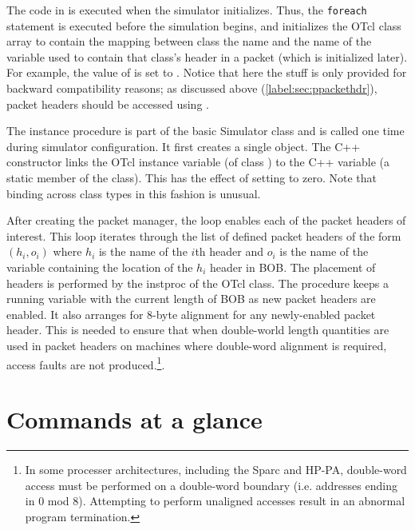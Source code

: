 The code in  is executed
when the simulator initializes.
Thus, the {\tt foreach} statement is executed before the
simulation begins, and initializes the OTcl class array
 to contain the mapping between class
the name and the name of the variable used to contain
that class's header in a packet (which is initialized later).
For example, the value of  is set to
.
Notice that here the  stuff is only provided
for backward compatibility reasons;
as discussed above (\ref{label:sec:ppackethdr}), packet headers should
be accessed using . 

The  instance procedure is part of the
basic Simulator class and is called one time during simulator
configuration.
It first creates a single  object.
The C++ constructor links the OTcl instance
variable  (of class )
to the C++ variable  (a static
member of the  class).
This has the effect of setting  to
zero.
Note that binding across class types in this fashion is
unusual.

\label{sec:configpacket}
After creating the packet manager, the 
loop enables each of the packet headers of interest.
This loop iterates through the list of defined
packet headers of the form
$(h_i, o_i)$ where $h_i$ is the name of the  $i$th header
and $o_i$ is the name of the variable containing the
location of the $h_i$ header in BOB.
The placement of headers is performed by the 
instproc of the  OTcl class.
The procedure keeps a running variable  with
the current length of BOB as new packet headers are enabled.
It also arranges for 8-byte alignment for any newly-enabled packet
header.
This is needed to ensure that when double-world length quantities
are used in packet headers on machines where double-word alignment
is required, access faults are not produced.\footnote{In
some processer architectures, including the
Sparc and HP-PA, double-word access must be performed on a double-word
boundary (i.e. addresses ending in 0 mod 8).  Attempting to perform
unaligned accesses result in an abnormal program termination.}.


\section{Commands at a glance}
\label{sec:pktcommand}

